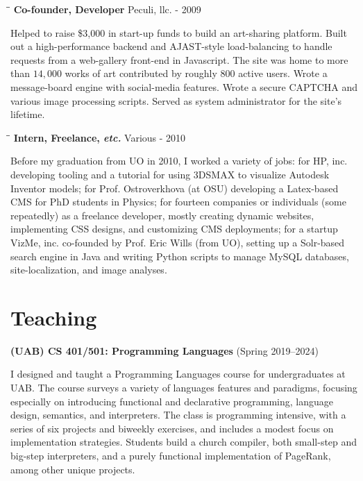 \documentclass[line]{res}
\begin{document}
\begin{resume}
   \vspace{-0.2cm}  
   \begin{tabbing}
    \hspace{2.25in}\= \hspace{2.25in}\= \kill %
    {\bf Co-founder, Developer} \>Peculi, llc.     - 2009
   \end{tabbing}\vspace{-0.5cm}      %
   Helped to raise \$3,000 in start-up funds to build an art-sharing platform. Built out a high-performance backend and AJAST-style
   load-balancing to handle requests from a web-gallery front-end in Javascript. The site was home to more than $14,000$ works of art contributed
   by roughly $800$ active users. Wrote a message-board engine with social-media features. Wrote a secure CAPTCHA and various image processing
   scripts. Served as system administrator for the site's lifetime.
   \vspace{-0.2cm}  
   \begin{tabbing}
    \hspace{2.25in}\= \hspace{2.25in}\= \kill %
    {\bf Intern, Freelance, \textit{etc.}} \>Various      - 2010
   \end{tabbing}\vspace{-0.5cm}      %
    Before my graduation from UO in 2010, I worked a variety of jobs: for HP, inc. developing tooling and a tutorial for using 3DSMAX to visualize Autodesk Inventor models; for Prof. Ostroverkhova (at OSU) developing a Latex-based CMS for PhD students in Physics; for fourteen companies or individuals (some repeatedly) as a freelance developer, mostly creating dynamic websites, implementing CSS designs, and customizing CMS deployments; for a startup VizMe, inc. co-founded by Prof. Eric Wills (from UO), setting up a Solr-based search engine in Java and writing Python scripts to manage MySQL databases, site-localization, and image analyses.
    
\section{\large Teaching} \vspace{0.2in}
    
\textbf{(UAB) CS 401/501: Programming Languages} (Spring 2019--2024)

I designed and taught a Programming Languages course for undergraduates at UAB. The course surveys a variety of languages features and paradigms, focusing especially on introducing functional and declarative programming, language design, semantics, and interpreters. The class is programming intensive, with a series of six projects and biweekly exercises, and includes a modest focus on implementation strategies. Students build a church compiler, both small-step and big-step interpreters, and a purely functional implementation of PageRank, among other unique projects.


\end{resume}
\end{document}
